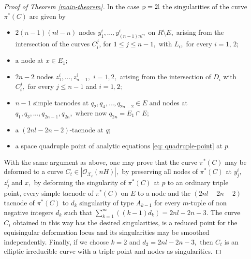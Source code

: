 \documentclass[plain]{amsart}
\def\p{\rm{p}}
\begin{document}
\begin{proof}[Proof of Theorem \ref{main-theorem}]
In the case $\p=2l$ the singularities of the curve $\pi^*(C)$ are given by
\begin{itemize}
\item $2(n-1)(nl-n)$ nodes $y_1^i,...,y^i_{(n-1)nl},$ on $R\setminus E,$ arising from the intersection of the 
curves $C_{i}^{j}$, for $1 \leq j \leq n-1,$ with $L_i,$ for every $i=1,\,2;$
\item a node at $x\in E_1;$
\item $2n-2$ nodes $z_1^i,...,z_{n-1}^i,$ $i=1,2,$ arising from the intersection of $D_i$ with $C_i^j,$ for every $j\leq n-1$ and $i=1,2;$
\item $n-1$  simple tacnodes at $q_2,q_4,...,q_{2n-2}\in E$ and nodes at $q_1,q_3,...,q_{2n-1},q_{2n},$ where
now $q_{2n}=E_1\cap E;$
\item a $(2nl-2n-2)$-tacnode at $q;$
\item a space quadruple point of analytic equations \eqref{eq: quadruple-point} at $p.$
\end{itemize}
With the same argument as above, one may prove that the curve $\pi^*(C)$ may be deformed
to a curve $C_t\in |\mathcal O_{\mathcal X_t}(nH)|,$ by preserving all
nodes of $\pi^*(C)$ at $y_j^i,$ $z_j^i$ and $x,$ by deforming the singularity of $\pi^*(C)$ at $p$ to an ordinary
triple point, every simple tacnode of $\pi^*(C)$ on $E$ to a node and the $(2nl-2n-2)$-tacnode of $\pi^*(C)$ to $d_k$ singularity of type $A_{k-1}$ for every
$m$-tuple of non negative integers $d_k$ such that $\sum_{k=1}^m((k-1)d_k)=2nl-2n-3.$ The curve $C_t$
obtained in this way has the desired singularities, is a reduced point for the equisingular
deformation locus and its singularities may be smoothed independently. Finally, if we choose $k=2$ and $d_2=
2nl-2n-3,$ then $C_t$ is an elliptic irreducible curve
with a triple point and nodes as singularities.
\end{proof}
\end{document}
